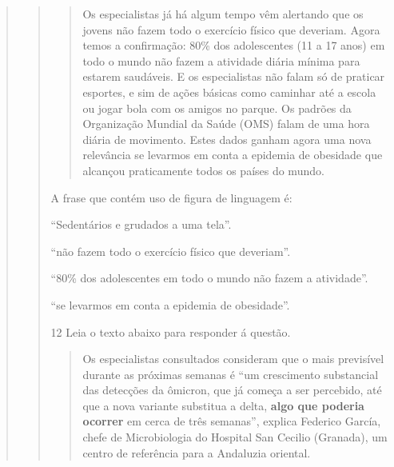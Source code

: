 \begin{quote}
\begin{quote}
\begin{quote}
Os especialistas já há algum tempo vêm alertando que os jovens não fazem todo o exercício físico que deveriam. Agora temos a confirmação: 80\% dos adolescentes (11 a 17 anos) em todo o mundo não fazem a atividade diária mínima para estarem saudáveis. E os especialistas não falam só de praticar esportes, e sim de ações básicas como caminhar até a escola ou jogar bola com os amigos no parque. Os padrões da Organização Mundial da Saúde (OMS) falam de uma hora diária de movimento. Estes dados ganham agora uma nova relevância se levarmos em conta a epidemia de obesidade que alcançou praticamente todos os países do mundo.

\end{quote}


A frase que contém uso de figura de linguagem é:

\begin{escolha}
    
    \item ``Sedentários e grudados a uma tela''.
    
    \item ``não fazem todo o exercício físico que deveriam''.
    
    \item ``80\% dos adolescentes em todo o mundo não fazem a atividade''.
    
    \item ``se levarmos em conta a epidemia de obesidade''.

\end{escolha}


\num{12} Leia o texto abaixo para responder á questão.

\begin{quote}

Os especialistas consultados consideram que o mais previsível durante as
próximas semanas é ``um crescimento substancial das detecções da
ômicron, que já começa a ser percebido, até que a nova variante
substitua a delta, \textbf{algo que poderia ocorrer} em cerca de três
semanas'', explica Federico García, chefe de Microbiologia do Hospital
San Cecilio (Granada), um centro de referência para a Andaluzia
oriental.


\end{quote}
\end{quote}
\end{quote}
